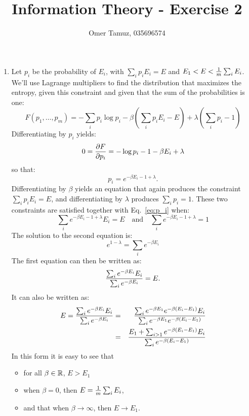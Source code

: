 \documentclass[11pt]{article} \usepackage{amssymb}
\begin{document}
\title{Information Theory - Exercise 2}

 \author{Omer Tamuz, 035696574}
\maketitle

\begin{enumerate}
\item 
Let $p_i$ be the probability of $E_i$, with $\sum_ip_iE_i=E$ and $E_1<E<{1\over m}\sum_iE_i$.
We'll use Lagrange multipliers to find the distribution that maximizes
the entropy, given this constraint and given that the sum of the 
probabilities is one:
\begin{equation*}
  F(p_1,\ldots,p_m) = -\sum_ip_i\log p_i -\beta(\sum_ip_iE_i-E) + \lambda(\sum_ip_i-1)
\end{equation*}
Differentiating by $p_i$ yields:
\begin{equation*}
  0={\partial F\over \partial p_i}=-\log p_i-1-\beta E_i+\lambda
\end{equation*}
so that:
\begin{equation}
  \label{eq:p_i}
  p_i=e^{-\beta E_i-1+\lambda}.
\end{equation}
Differentiating by $\beta$ yields an equation that again produces the
constraint $\sum_i p_iE_i=E$, and differentiating by $\lambda$ produces
$\sum_ip_i=1$. These two constraints are satisfied together with 
Eq.~\ref{eq:p_i} when:
\begin{equation*}
  \sum_ie^{-\beta E_i-1+\lambda}E_i=E \quad \mbox{and} \quad 
  \sum_ie^{-\beta E_i-1+\lambda}=1
\end{equation*}
The solution to the second equation is:
\begin{equation*}
  e^{1-\lambda}=\sum_i e^{-\beta E_i}
\end{equation*}
The first equation can then be written as:
\begin{eqnarray}
  \label{eq:beta1}
  {\sum_i e^{-\beta E_i}E_i\over \sum_i e^{-\beta E_i}}=E.
\end{eqnarray}
It can also be written as:
\begin{eqnarray*}
  E={\sum_i e^{-\beta E_i}E_i\over \sum_i e^{-\beta E_i}}&=&
{\sum_i e^{-\beta E_1}e^{-\beta (E_i-E_1)}E_i\over \sum_i e^{-\beta E_1}e^{-\beta (E_i-E_1)}}
\\ &=&
{E_1+\sum_{i>1}e^{-\beta (E_i-E_1)}E_i\over \sum_i e^{-\beta (E_i-E_1)}}
\end{eqnarray*}
In this form it is easy to see that 
\begin{itemize}
\item 
  for all $\beta\in \mathbb R$, $E>E_1$
\item 
when $\beta=0$, then $E={1\over m}\sum_iE_i$,
\item
and that when $\beta \to \infty$, then $E\to E_1$.  
\end{itemize}


\end{enumerate}
\end{document}
